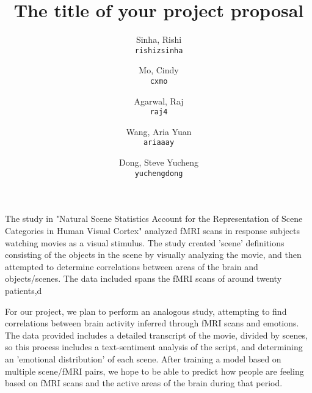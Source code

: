 \documentclass[11pt]{article}
\title{The title of your project proposal}
\author{
  Sinha, Rishi\\
  \texttt{rishizsinha}
  \and
  Mo, Cindy\\
  \texttt{cxmo}
  \and
  Agarwal, Raj\\
  \texttt{raj4}
  \and
  Wang, Aria Yuan\\
  \texttt{ariaaay}
  \and
  Dong, Steve Yucheng\\
  \texttt{yuchengdong}
}
\begin{document}
\maketitle

The study in "Natural Scene Statistics Account for the Representation of 
Scene Categories in Human Visual Cortex"\cite{stansbury2013neuron} analyzed 
fMRI scans in response subjects watching movies as a visual stimulus.
The study created 'scene' definitions consisting of the objects in the scene
by visually analyzing the movie, and then attempted to determine correlations
between areas of the brain and objects/scenes. The data included spans the
fMRI scans of around twenty patients,d

For our project, we plan to perform an analogous study, attempting to find
correlations between brain activity inferred through fMRI scans and emotions.
The data provided includes a detailed transcript of the movie, divided by 
scenes, so this process includes a text-sentiment analysis of the script, 
and determining an 'emotional distribution' of each scene. After training a 
model based on multiple scene/fMRI pairs, we hope to be able to predict
how people are feeling based on fMRI scans and the active areas of the brain
during that period. 


\end{document}
